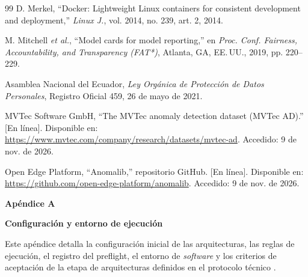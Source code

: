 \documentclass[12pt,oneside]{report}
\makeatletter
\newcommand{\encabezado}{\@ifstar{\@encabezadoS}{\@encabezadoN}}
\newcommand{\@encabezadoN}[1]{%
  \phantomsection\addcontentsline{toc}{chapter}{#1}%
  {\centering\bfseries #1\par}}
\newcommand{\@encabezadoS}[1]{{\centering\bfseries #1\par}}
\makeatother
\begin{document}
\begin{thebibliography}{99}
 D. Merkel, ``Docker: Lightweight Linux containers for consistent development and deployment,'' \textit{Linux J.}, vol. 2014, no. 239, art. 2, 2014.

 M. Mitchell \textit{et al.}, ``Model cards for model reporting,'' en \textit{Proc. Conf. Fairness, Accountability, and Transparency (FAT*)}, Atlanta, GA, EE.\,UU., 2019, pp. 220--229.

 Asamblea Nacional del Ecuador, \textit{Ley Orgánica de Protección de Datos Personales}, Registro Oficial 459, 26 de mayo de 2021.

 MVTec Software GmbH, ``The MVTec anomaly detection dataset (MVTec AD).'' [En línea]. Disponible en: \url{https://www.mvtec.com/company/research/datasets/mvtec-ad}. Accedido: 9 de nov. de 2026.

 Open Edge Platform, ``Anomalib,'' repositorio GitHub. [En línea]. Disponible en: \url{https://github.com/open-edge-platform/anomalib}. Accedido: 9 de nov. de 2026.
\end{thebibliography}
\endgroup

\clearpage
\encabezado{Apéndices}

\clearpage
{}
{\centering\bfseries Apéndice A\par}
{\centering\bfseries Configuración y entorno de ejecución\par}

Este apéndice detalla la configuración inicial de las arquitecturas, las reglas de ejecución, el registro del preflight, el entorno de \textit{software} y los criterios de aceptación de la etapa de arquitecturas definidos en el protocolo técnico \cite{paez2026}.
\end{document}
